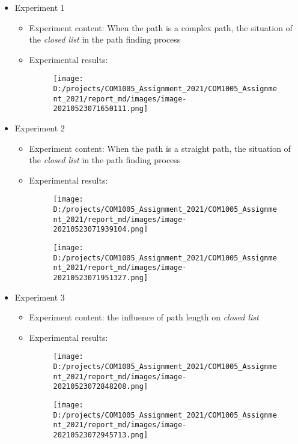 \documentclass[
]{article}
\begin{document}
\begin{itemize}
\item
  Experiment 1

  \begin{itemize}
  \item
    Experiment content: When the path is a complex path, the situation
    of the \emph{closed list} in the path finding process
  \item
    Experimental results:

    \begin{figure}
    \centering
    \texttt{[image: D:/projects/COM1005\_Assignment\_2021/COM1005\_Assignment\_2021/report\_md/images/image-20210523071650111.png]}
    \caption{}
    \end{figure}
  \end{itemize}
\item
  Experiment 2

  \begin{itemize}
  \item
    Experiment content: When the path is a straight path, the situation
    of the \emph{closed list} in the path finding process
  \item
    Experimental results:

    \begin{figure}
    \centering
    \texttt{[image: D:/projects/COM1005\_Assignment\_2021/COM1005\_Assignment\_2021/report\_md/images/image-20210523071939104.png]}
    \caption{}
    \end{figure}

    \begin{figure}
    \centering
    \texttt{[image: D:/projects/COM1005\_Assignment\_2021/COM1005\_Assignment\_2021/report\_md/images/image-20210523071951327.png]}
    \caption{}
    \end{figure}
  \end{itemize}
\item
  Experiment 3

  \begin{itemize}
  \item
    Experiment content: the influence of path length on \emph{closed
    list}
  \item
    Experimental results:

    \begin{figure}
    \centering
    \texttt{[image: D:/projects/COM1005\_Assignment\_2021/COM1005\_Assignment\_2021/report\_md/images/image-20210523072848208.png]}
    \caption{}
    \end{figure}

    \begin{figure}
    \centering
    \texttt{[image: D:/projects/COM1005\_Assignment\_2021/COM1005\_Assignment\_2021/report\_md/images/image-20210523072945713.png]}
    \caption{}
    \end{figure}
  \end{itemize}
\end{itemize}
\end{document}
